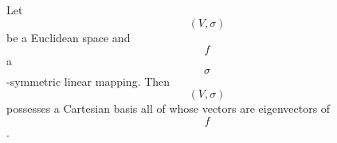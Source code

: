 Let $$(V, \sigma)$$ be a Euclidean space and $$f$$ a $$\sigma$$-symmetric linear mapping. Then $$(V, \sigma)$$ possesses a Cartesian basis all of whose vectors are eigenvectors of $$f$$.

